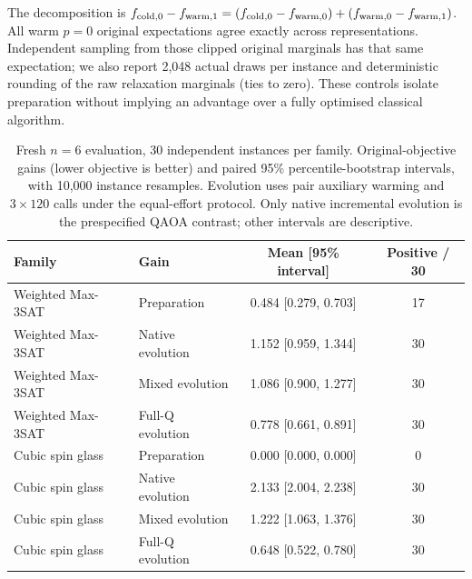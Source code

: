 The decomposition is $f_{\rm cold,0}-f_{\rm warm,1}=(f_{\rm cold,0}-f_{\rm warm,0})+(f_{\rm warm,0}-f_{\rm warm,1})$. All warm $p=0$ original expectations agree exactly across representations. Independent sampling from those clipped original marginals has that same expectation; we also report 2,048 actual draws per instance and deterministic rounding of the raw relaxation marginals (ties to zero). These controls isolate preparation without implying an advantage over a fully optimised classical algorithm.

\begin{table}[t]\centering\small

\caption{Fresh $n=6$ evaluation, 30 independent instances per family. Original-objective gains (lower objective is better) and paired 95\% percentile-bootstrap intervals, with 10,000 instance resamples. Evolution uses pair auxiliary warming and $3\times120$ calls under the equal-effort protocol. Only native incremental evolution is the prespecified QAOA contrast; other intervals are descriptive.}

\label{tab:fresh-warm-gain}

\begin{tabular}{llcc}\toprule

Family & Gain & Mean [95\% interval] & Positive / 30\\\midrule

Weighted Max-3SAT & Preparation & 0.484 [0.279, 0.703] & 17 \\

Weighted Max-3SAT & Native evolution & 1.152 [0.959, 1.344] & 30 \\

Weighted Max-3SAT & Mixed evolution & 1.086 [0.900, 1.277] & 30 \\

Weighted Max-3SAT & Full-Q evolution & 0.778 [0.661, 0.891] & 30 \\

Cubic spin glass & Preparation & 0.000 [0.000, 0.000] & 0 \\

Cubic spin glass & Native evolution & 2.133 [2.004, 2.238] & 30 \\

Cubic spin glass & Mixed evolution & 1.222 [1.063, 1.376] & 30 \\

Cubic spin glass & Full-Q evolution & 0.648 [0.522, 0.780] & 30 \\

\bottomrule\end{tabular}\end{table}


